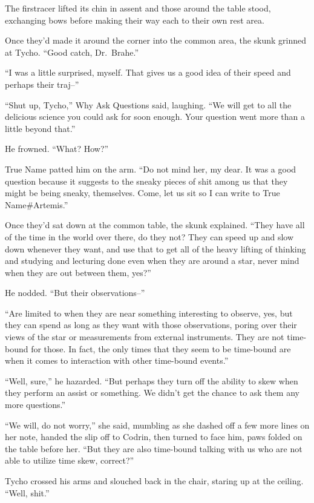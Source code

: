 The firstracer lifted its chin in assent and those around the table stood, exchanging bows before making their way each to their own rest area.

Once they'd made it around the corner into the common area, the skunk grinned at Tycho. ``Good catch, Dr.~Brahe.''

``I was a little surprised, myself. That gives us a good idea of their speed and perhaps their traj--''

``Shut up, Tycho,'' Why Ask Questions said, laughing. ``We will get to all the delicious science you could ask for soon enough. Your question went more than a little beyond that.''

He frowned. ``What? How?''

True Name patted him on the arm. ``Do not mind her, my dear. It was a good question because it suggests to the sneaky pieces of shit among us that they might be being sneaky, themselves. Come, let us sit so I can write to True Name\#Artemis.''

Once they'd sat down at the common table, the skunk explained. ``They have all of the time in the world over there, do they not? They can speed up and slow down whenever they want, and use that to get all of the heavy lifting of thinking and studying and lecturing done even when they are around a star, never mind when they are out between them, yes?''

He nodded. ``But their observations--''

``Are limited to when they are near something interesting to observe, yes, but they can spend as long as they want with those observations, poring over their views of the star or measurements from external instruments. They are not time-bound for those. In fact, the only times that they seem to be time-bound are when it comes to interaction with other time-bound events.''

``Well, sure,'' he hazarded. ``But perhaps they turn off the ability to skew when they perform an assist or something. We didn't get the chance to ask them any more questions.''

``We will, do not worry,'' she said, mumbling as she dashed off a few more lines on her note, handed the slip off to Codrin, then turned to face him, paws folded on the table before her. ``But they are also time-bound talking with us who are not able to utilize time skew, correct?''

Tycho crossed his arms and slouched back in the chair, staring up at the ceiling. ``Well, shit.''

